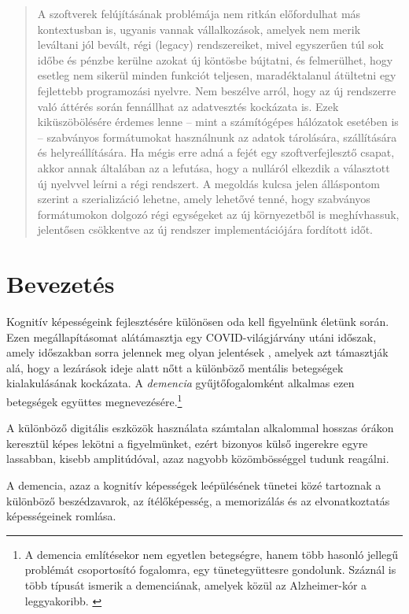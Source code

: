 \documentclass[tocnopagenum]{thesis-ekf}
\begin{document}
\begin{abstract}
		A szoftverek felújításának problémája nem ritkán előfordulhat más kontextusban is, ugyanis vannak vállalkozások, amelyek nem merik leváltani jól bevált, régi (legacy) rendszereiket, mivel egyszerűen túl sok időbe és pénzbe kerülne azokat új köntösbe bújtatni, és felmerülhet, hogy esetleg nem sikerül minden funkciót teljesen, maradéktalanul átültetni egy fejlettebb programozási nyelvre. Nem beszélve arról, hogy az új rendszerre való áttérés során fennállhat az adatvesztés kockázata is. Ezek kiküszöbölésére érdemes lenne -- mint a számítógépes hálózatok esetében is --  szabványos formátumokat használnunk az adatok tárolására, szállítására és helyreállítására. Ha mégis erre adná a fejét egy szoftverfejlesztő csapat, akkor annak általában az a lefutása, hogy a nulláról elkezdik a választott új nyelvvel leírni a régi rendszert. A megoldás kulcsa jelen álláspontom szerint a szerializáció lehetne, amely lehetővé tenné, hogy szabványos formátumokon dolgozó régi egységeket az új környezetből is meghívhassuk, jelentősen csökkentve az új rendszer implementációjára fordított időt.
	\end{abstract}
	\section{Bevezetés}
	Kognitív képességeink fejlesztésére különösen oda kell figyelnünk életünk során. Ezen megállapításomat alátámasztja egy COVID-világjárvány utáni időszak, amely időszakban sorra jelennek meg olyan jelentések 
	\cite{brain1}, amelyek azt támasztják alá, hogy a lezárások ideje alatt nőtt a különböző mentális betegségek kialakulásának kockázata. A \textit{demencia} gyűjtőfogalomként alkalmas ezen betegségek együttes megnevezésére.\footnote{A demencia említésekor nem egyetlen betegségre, hanem több hasonló jellegű problémát  csoportosító fogalomra, egy tünetegyüttesre gondolunk. Száznál is több típusát ismerik a demenciának, amelyek közül az Alzheimer-kór a leggyakoribb. \cite{demencia_egeszsegvonal}}
	
	A különböző digitális eszközök használata számtalan alkalommal hosszas órákon keresztül képes lekötni a figyelmünket, ezért bizonyos külső ingerekre egyre lassabban, kisebb amplitúdóval, azaz nagyobb közömbösséggel tudunk reagálni. 
	
	A demencia, azaz a kognitív képességek leépülésének tünetei közé tartoznak a különböző beszédzavarok, az ítélőképesség, a memorizálás és az elvonatkoztatás képességeinek romlása.
	
\end{document}
